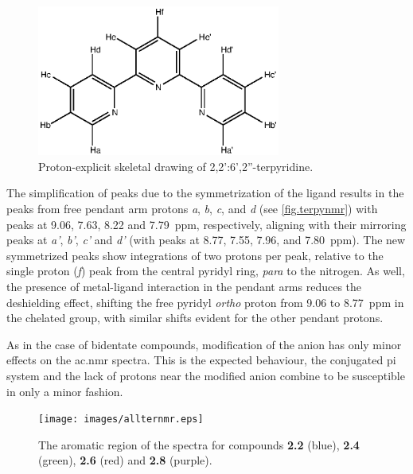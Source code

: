 \begin{figure}[!htb]
 \begin{center}
  \includegraphics[clip=true, width=80mm, keepaspectratio]{images/expandedterpyridine.eps}
 \end{center}
\caption[Proton-explicit skeletal drawing of 2,2':6',2''-terpyridine.]{Proton-explicit skeletal drawing of 2,2':6',2''-terpyridine.}
\label{fig.terpynmr}
\end{figure} 

The simplification of peaks due to the symmetrization of the ligand results in the peaks from free pendant arm protons \textit{a}, \textit{b}, \textit{c}, and \textit{d} (see \autoref{fig.terpynmr}) with peaks at 9.06, 7.63, 8.22 and 7.79~ppm, respectively, aligning with their mirroring peaks at \textit{a'}, \textit{b'}, \textit{c'} and \textit{d'} (with peaks at 8.77, 7.55, 7.96, and 7.80~ppm). The new symmetrized peaks show integrations of two protons per peak, relative to the single proton (\textit{f}) peak from the central pyridyl ring, \textit{para} to the nitrogen. As well, the presence of metal-ligand interaction in the pendant arms reduces the deshielding effect, shifting the free pyridyl \textit{ortho} proton from 9.06 to 8.77~ppm in the chelated group, with similar shifts evident for the other pendant protons.

As in the case of bidentate compounds, modification of the anion has only minor effects on the \gls{ac.nmr} spectra. This is the expected behaviour, the conjugated pi system and the lack of protons near the modified anion combine to be susceptible in only a minor fashion.  

\begin{figure}[!htb]
 \begin{center}
  \texttt{[image: images/allternmr.eps]}
 \end{center}
\caption[The aromatic region of the \texorpdfstring{}{1H}  spectra of the four terdentate compounds.]{The aromatic region of the \texorpdfstring{}{1H}  spectra for compounds \textbf{2.2} (blue), \textbf{2.4} (green), \textbf{2.6} (red) and \textbf{2.8} (purple).}
\label{fig.ter4nmr}
\end{figure} 

